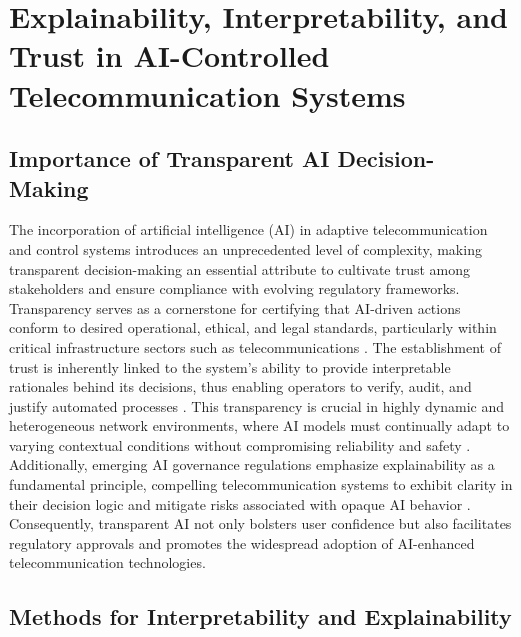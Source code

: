 \section{Explainability, Interpretability, and Trust in AI-Controlled Telecommunication Systems}

\subsection{Importance of Transparent AI Decision-Making}

The incorporation of artificial intelligence (AI) in adaptive telecommunication and control systems introduces an unprecedented level of complexity, making transparent decision-making an essential attribute to cultivate trust among stakeholders and ensure compliance with evolving regulatory frameworks. Transparency serves as a cornerstone for certifying that AI-driven actions conform to desired operational, ethical, and legal standards, particularly within critical infrastructure sectors such as telecommunications \cite{ref7,ref13}. The establishment of trust is inherently linked to the system’s ability to provide interpretable rationales behind its decisions, thus enabling operators to verify, audit, and justify automated processes \cite{ref15}. This transparency is crucial in highly dynamic and heterogeneous network environments, where AI models must continually adapt to varying contextual conditions without compromising reliability and safety \cite{ref48}. Additionally, emerging AI governance regulations emphasize explainability as a fundamental principle, compelling telecommunication systems to exhibit clarity in their decision logic and mitigate risks associated with opaque AI behavior \cite{ref50}. Consequently, transparent AI not only bolsters user confidence but also facilitates regulatory approvals and promotes the widespread adoption of AI-enhanced telecommunication technologies.

\subsection{Methods for Interpretability and Explainability}


